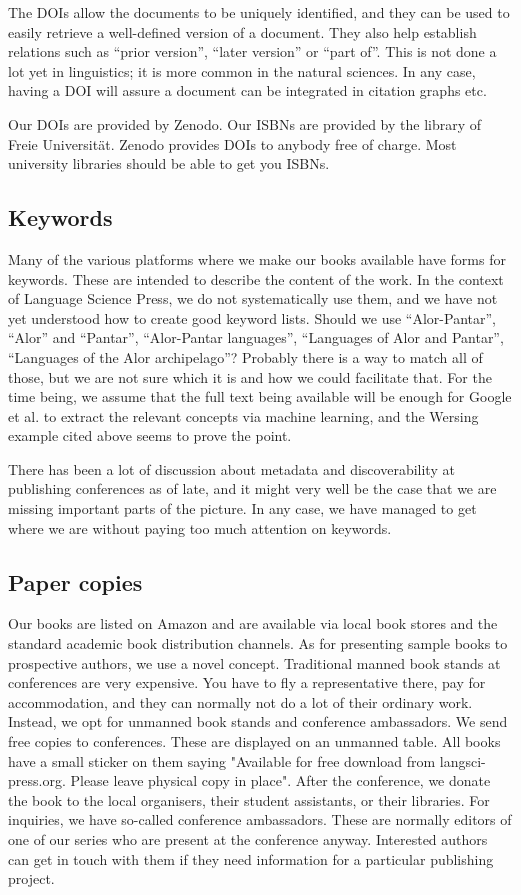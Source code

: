 \documentclass[output=guidelines,guidelines] {langscibook}
\begin{document}
The DOIs allow the documents to be uniquely identified, and they can be used to easily retrieve a well-defined version of a document. They also help establish relations such as ``prior version'', ``later version'' or ``part of''. This is not done a lot yet in linguistics; it is more common in the natural sciences. In any case, having a DOI will assure a document can be integrated in citation graphs etc. 

Our DOIs are provided by Zenodo. Our ISBNs are provided by the library of Freie Universität. Zenodo provides DOIs to anybody free of charge. Most university libraries should be able to get you ISBNs. 


\subsection{Keywords }
Many of the various platforms where we make our books available have forms for keywords. These are intended to describe the content of the work. In the context of Language Science Press, we do not systematically use them, and we have not yet understood how to create good keyword lists. Should we use ``Alor-Pantar'', ``Alor'' and ``Pantar'', ``Alor-Pantar languages'', ``Languages of Alor and Pantar'', ``Languages of the Alor archipelago''? Probably there is a way to match all of those, but we are not sure which it is and how we could facilitate that. For the time being, we assume that the full text being available will be enough for Google et al. to extract the relevant concepts via machine learning, and the Wersing example cited above seems to prove the point. 

There has been a lot of discussion about metadata and discoverability at publishing conferences as of late, and it might very well be the case that we are missing important parts of the picture. In any case, we have managed to get where we are without paying too much attention on keywords. 
                    
\subsection{Paper copies}                    
Our books are listed on Amazon and are available via local book stores and the standard academic book distribution channels. As for presenting sample books to prospective authors, we use a novel concept. Traditional manned book stands at conferences are very expensive. You have to fly a representative there, pay for accommodation, and they can normally not do a lot of their ordinary work. Instead, we opt for unmanned book stands and conference ambassadors. We send free copies to conferences.  These are displayed on an unmanned table. All books have a small sticker on them saying "Available for free download from langsci-press.org. Please leave physical copy in place". After the conference, we donate the book to the local organisers, their student assistants, or their libraries. 
For inquiries, we have so-called conference ambassadors. These are normally editors of one of our series who are present at the conference anyway. Interested authors can get in touch with them if they need information for a particular publishing project. 
                    
\end{document}
